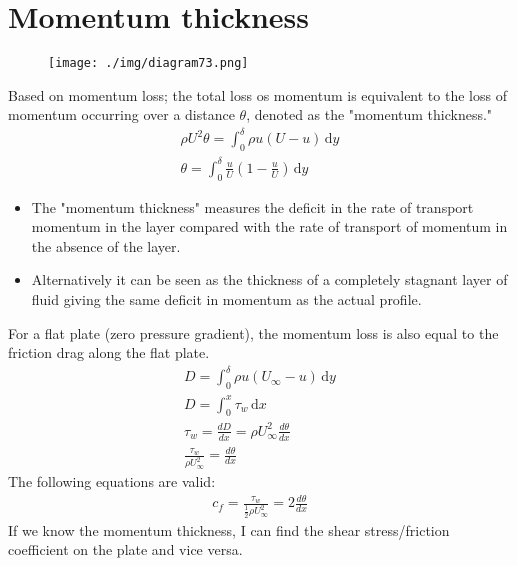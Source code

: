 \section{Momentum thickness}
\begin{figure}[H]
  \centering
  \texttt{[image: ./img/diagram73.png]}
  \caption{}
\end{figure}
Based on momentum loss; the total loss os momentum is equivalent to the loss of momentum occurring over a distance $\theta$, denoted as the "momentum thickness."
\begin{gather}
  \rho U^2 \theta = \int_{0}^{\delta} \rho u (U - u) \,\mathrm{d}y\\
  \theta = \int_{0}^{\delta} \frac{u}{U} \left(1 - \frac{u}{U}\right) \,\mathrm{d}y
\end{gather}
\begin{itemize}
  \item The "momentum thickness" measures the deficit in the rate of transport momentum in the layer compared with the rate of transport of momentum in the absence of the layer.
  \item Alternatively it can be seen as the thickness of a completely stagnant layer of fluid giving the same deficit in momentum as the actual profile.
\end{itemize}
For a flat plate (zero pressure gradient), the momentum loss is also equal to the friction drag along the flat plate.
\begin{gather}
  D = \int_{0}^{\delta} \rho u (U_\infty - u) \,\mathrm{d}y\\
  D = \int_{0}^{x} \tau_w \,\mathrm{d}x\\
  \tau_w = \frac{dD}{dx} = \rho U_\infty^2 \frac{d\theta}{dx}\\
  \frac{\tau_w}{\rho U_\infty^2} = \frac{d\theta}{dx}
\end{gather}
The following equations are valid:
\begin{align}
  c_f = \frac{\tau_w}{\frac{1}{2}\rho U_\infty^2} = 2\frac{d\theta}{dx}
\end{align}
If we know the momentum thickness, I can find the shear stress/friction coefficient on the plate and vice versa.
